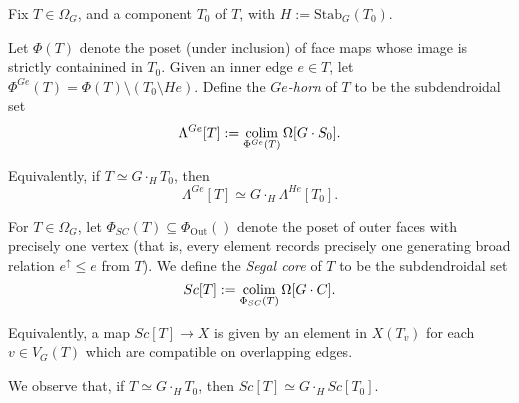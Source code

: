 \documentclass[a4paper,10pt,draft]{article}%
\numberwithin{equation}{section}%
\begin{document}
\begin{definition}
      Fix $T\in \Omega_G$, and a component $T_0$ of $T$, with $H := \mathrm{Stab}_G(T_0)$.
      
      Let $\Phi(T)$ denote the poset (under inclusion) of face maps whose image is
      strictly containined in $T_0$.
      Given an inner edge $e \in T$, let
      $\Phi^{Ge}(T) = \Phi(T) \setminus (T_0 \setminus H e)$.
      Define the \textit{$Ge$-horn} of $T$ to be the subdendroidal set
      \begin{equation}
            \Lambda^{Ge}[T] := \mathop{\operatorname{colim}}\limits_{\Phi^{Ge}(T)}\Omega[G \cdot S_0].
      \end{equation}
\end{definition}

\begin{remark}
      Equivalently, if $T \simeq G \cdot_H T_0$, then
      \begin{equation}
            \Lambda^{G e}[T] \simeq G \cdot_H \Lambda^{H e}[T_0].
      \end{equation}
\end{remark}

\begin{definition}
      For $T \in \Omega_G$, let $\Phi_{SC}(T) \subseteq \Phi_{\mathrm{Out}}()$ denote the poset of outer faces
      with precisely one vertex
      (that is, every element records precisely one generating broad relation
      $e^\uparrow \leq e$ from $T$).
      We define the \textit{Segal core} of $T$ to be the subdendroidal set
      \begin{equation}
            Sc[T] := \mathop{\operatorname{colim}}\limits_{\Phi_{SC}(T)}\Omega[G \cdot C].
      \end{equation}
\end{definition}

\begin{remark}
      Equivalently, a map $Sc[T] \to X$ is given by an element in $X(T_v)$ for each $v \in V_G(T)$
      which are compatible on overlapping edges.
\end{remark}

\begin{remark}
      We observe that, if $T \simeq G \cdot_H T_0$, then
      $Sc[T] \simeq G \cdot_H Sc[T_0]$.
\end{remark}
\end{document}
